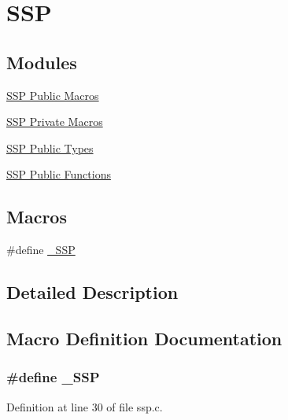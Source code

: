 \hypertarget{group___s_s_p}{}\section{S\+SP}
\label{group___s_s_p}
\subsection*{Modules}
\begin{DoxyCompactItemize}
\item 
\hyperlink{group___s_s_p___public___macros}{S\+S\+P Public Macros}
\item 
\hyperlink{group___s_s_p___private___macros}{S\+S\+P Private Macros}
\item 
\hyperlink{group___s_s_p___public___types}{S\+S\+P Public Types}
\item 
\hyperlink{group___s_s_p___public___functions}{S\+S\+P Public Functions}
\end{DoxyCompactItemize}
\subsection*{Macros}
\begin{DoxyCompactItemize}
\item 
\#define \hyperlink{group___s_s_p_ga4bbcc6ac233526a75040c15029532d13}{\+\_\+\+S\+SP}
\end{DoxyCompactItemize}


\subsection{Detailed Description}


\subsection{Macro Definition Documentation}
\subsubsection[{\texorpdfstring{\+\_\+\+S\+SP}{_SSP}}]{\setlength{\rightskip}{0pt plus 5cm}\#define \+\_\+\+S\+SP}\hypertarget{group___s_s_p_ga4bbcc6ac233526a75040c15029532d13}{}\label{group___s_s_p_ga4bbcc6ac233526a75040c15029532d13}


Definition at line 30 of file ssp.\+c.

